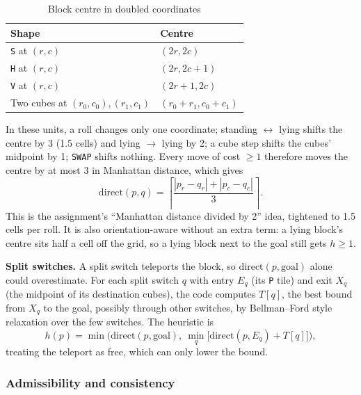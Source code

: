 \begin{table}[H]
\centering
\caption{Block centre in doubled coordinates}
\label{tab:centre}
\begin{tabular}{ll}
\toprule
\textbf{Shape} & \textbf{Centre} \\
\midrule
\texttt{S} at $(r,c)$ & $(2r, 2c)$ \\
\texttt{H} at $(r,c)$ & $(2r, 2c+1)$ \\
\texttt{V} at $(r,c)$ & $(2r+1, 2c)$ \\
Two cubes at $(r_0,c_0), (r_1,c_1)$ & $(r_0+r_1, c_0+c_1)$ \\
\bottomrule
\end{tabular}
\end{table}

In these units, a roll changes only one coordinate; standing $\leftrightarrow$ lying shifts the
centre by 3 (1.5 cells) and lying $\to$ lying by 2; a cube step shifts the cubes' midpoint by 1;
\texttt{SWAP} shifts nothing. Every move of cost $\ge 1$ therefore moves the centre by at most 3 in
Manhattan distance, which gives
\begin{equation}
\mathrm{direct}(p, q) = \left\lceil \frac{|p_r - q_r| + |p_c - q_c|}{3} \right\rceil .
\end{equation}
This is the assignment's ``Manhattan distance divided by 2'' idea, tightened to 1.5 cells per roll.
It is also orientation-aware without an extra term: a lying block's centre sits half a cell off the
grid, so a lying block next to the goal still gets $h \ge 1$.

\textbf{Split switches.} A split switch teleports the block, so $\mathrm{direct}(p, \text{goal})$
alone could overestimate. For each split switch $q$ with entry $E_q$ (its \texttt{P} tile) and exit
$X_q$ (the midpoint of its destination cubes), the code computes $T[q]$, the best bound from $X_q$
to the goal, possibly through other switches, by Bellman--Ford style relaxation over the few
switches. The heuristic is
\begin{equation}
h(p) = \min\Big( \mathrm{direct}(p, \text{goal}),\ \min_q \big[\mathrm{direct}(p, E_q) + T[q]\big] \Big),
\end{equation}
treating the teleport as free, which can only lower the bound.

\subsubsection{Admissibility and consistency}
\label{sec:admissible}

